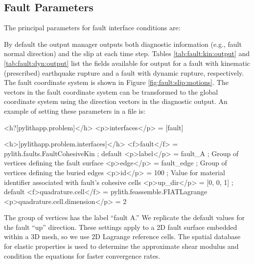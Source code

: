 \subsection{Fault Parameters}

The principal parameters for fault interface conditions are:
\begin{inventory}
\end{inventory}
By default the output manager outputs both diagnostic information
(e.g., fault normal direction) and the slip at each time step. Tables
\vref{tab:fault:kin:output} and \vref{tab:fault:dyn:output} list the
fields available for output for a fault with kinematic (prescribed)
earthquake rupture and a fault with dynamic rupture, respectively.
The fault coordinate system is shown in Figure \vref{fig:fault:slip:motions}.
The vectors in the fault coordinate system can be transformed to the
global coordinate system using the direction vectors in the diagnostic
output. An example of setting these parameters in a 
file is:
\begin{cfg}
<h?[pylithapp.problem]</h>
<p>interfaces</p> = [fault] 

<h>[pylithapp.problem.interfaces]</h>
<f>fault</f> = pylith.faults.FaultCohesiveKin ; default
<p>label</p> = fault_A ; Group of vertices defining the fault surface
<p>edge</p> = fault_edge ; Group of vertices defining the buried edges
<p>id</p> = 100 ; Value for material identifier associated with fault's cohesive cells
<p>up_dir</p> = [0, 0, 1] ; default
<f>quadrature.cell</f> = pylith.feassemble.FIATLagrange
<p>quadrature.cell.dimension</p> = 2
\end{cfg}
The group of vertices has the label ``fault A.'' We replicate the
default values for the fault ``up'' direction. These settings apply
to a 2D fault surface embedded within a 3D mesh, so we use 2D Lagrange
reference cells. The spatial database for elastic properties is used
to determine the approximate shear modulus and condition the equations
for faster convergence rates.


